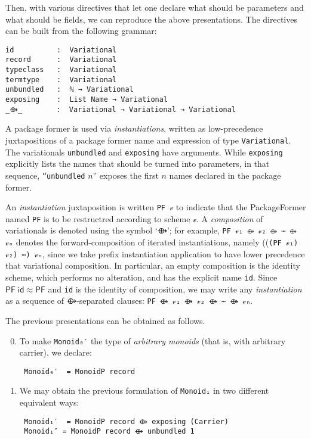 \documentclass[sigplan,screen]{acmart}
\begin{document}
\noindent

 Then, with various directives that let one declare
 what should be parameters and what should be fields,
 we can reproduce the above presentations.
The directives can be built from the following grammar:
\begin{verbatim}
id          :  Variational
record      :  Variational
typeclass   :  Variational
termtype    :  Variational
unbundled   :  ℕ → Variational
exposing    :  List Name → Variational
_⟴_        :  Variational → Variational → Variational
\end{verbatim}

\noindent
  A package former is used via \emph{instantiations}, written as low-precedence
 juxtapositions of a package former name and expression of type
 \texttt{Variational}.
 The variationals \texttt{unbundled} and \texttt{exposing} have arguments.
 While \texttt{exposing} explicitly lists the names that should be turned
 into parameters, in that sequence, \texttt{“unbundled} \(n\)” exposes the
 first \(n\) names declared in the package former.

 An \emph{instantiation} juxtaposition is written \texttt{PF 𝓋} to indicate that the PackageFormer
 named \texttt{PF} is to be restructred according to scheme \texttt{𝓋}. A \emph{composition} of variationals
 is denoted using the symbol ‘⟴’; for example,
 \texttt{PF 𝓋₁ ⟴ 𝓋₂ ⟴ ⋯ ⟴ 𝓋ₙ} denotes the forward-composition of iterated instantiations,
 namely ((\texttt{(PF 𝓋₁) 𝓋₂) ⋯) 𝓋ₙ}, since we take prefix instantiation application
to have lower precedence that variational composition.
 In particular, an empty composition is the identity
 scheme, which performs no alteration, and has the explicit name \texttt{id}.
 Since \(\mathsf{PF} \; \mathsf{id} ≈ \mathsf{PF}\) and \texttt{id} is the identity of composition, we may
 write any \emph{instantiation} as a sequence of \hspace{0.2em} ⟴-separated clauses:
\texttt{PF ⟴ 𝓋₁ ⟴ 𝓋₂ ⟴ ⋯ ⟴ 𝓋ₙ}.

The previous presentations can be obtained as follows.

\begin{enumerate}
\setcounter{enumi}{-1}
\item To make \texttt{Monoid₀′} the type of \emph{arbitrary monoids}
(that is, with arbitrary carrier), we declare:
     \vspace{0.3em}
\begin{verbatim}
 Monoid₀′  = MonoidP record
\end{verbatim}

\setcounter{enumi}{0}
\item We may obtain the previous formulation of
\texttt{Monoid₁} in two different equivalent ways:
   \vspace{0.3em}
\begin{verbatim}
 Monoid₁′  = MonoidP record ⟴ exposing (Carrier)
 Monoid₁″ = MonoidP record ⟴ unbundled 1
\end{verbatim}
\end{enumerate}
\end{document}
